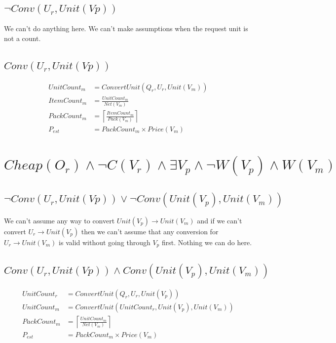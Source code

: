 \documentclass[11pt]{article}
\begin{document}
\subsection{$\neg Conv(U_r, Unit(Vp))$}

We can't do anything here. We can't make assumptions when the request unit is not a count.

\subsection{$Conv(U_r, Unit(Vp))$}

\begin{align}
	UnitCount_m &= ConvertUnit(Q_r, U_r, Unit(V_m))\\
	ItemCount_m &= \frac{UnitCount_m}{Net(V_m)}\\
	PackCount_m &= \left\lceil\frac{ItemCount_m}{Pack(V_m)}\right\rceil\\
	P_{est} &= PackCount_m\times Price(V_m)
\end{align}

\section{$Cheap(O_r)\wedge\neg C(V_r)\wedge\exists V_p\wedge\neg W(V_p)\wedge W(V_m)$}

\subsection{$\neg Conv(U_r, Unit(Vp))\vee\neg Conv(Unit(V_p), Unit(V_m))$}

We can't assume any way to convert $Unit(V_p)\rightarrow Unit(V_m)$ and if we can't convert $U_r\rightarrow Unit(V_p)$ then we can't assume that any conversion for $U_r\rightarrow Unit(V_m)$ is valid without going through $V_p$ first. Nothing we can do here.

\subsection{$Conv(U_r, Unit(Vp))\wedge Conv(Unit(V_p), Unit(V_m))$}

\begin{align}
	UnitCount_r &= ConvertUnit(Q_r, U_r, Unit(V_p))\\
	UnitCount_m &= ConvertUnit(UnitCount_r, Unit(V_p), Unit(V_m))\\
	PackCount_m &= \left\lceil\frac{UnitCount_m}{Net(V_m)}\right\rceil\\
	P_{est} &= PackCount_m\times Price(V_m)
\end{align}
\end{document}
